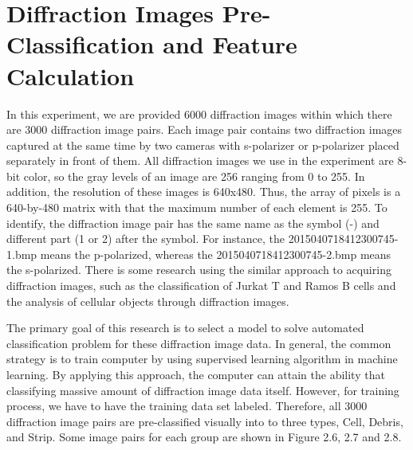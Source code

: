 \section{Diffraction Images Pre-Classification and Feature Calculation}
In this experiment, we are provided 6000 diffraction images within which there are 3000 diffraction image pairs. Each image pair contains two diffraction images captured at the same time by two cameras with s-polarizer or p-polarizer placed separately in front of them. All diffraction images we use in the experiment are 8-bit color, so the gray levels of an image are 256 ranging from 0 to 255. In addition, the resolution of these images is 640x480. Thus, the array of pixels is a 640-by-480 matrix with that the maximum number of each element is 255. To identify, the diffraction image pair has the same name as the symbol (-) and different part (1 or 2) after the symbol. For instance, the 2015040718412300745-1.bmp means the p-polarized, whereas the 2015040718412300745-2.bmp means the s-polarized. There is some research using the similar approach to acquiring diffraction images, such as the classification of Jurkat T and Ramos B cells\cite{Feng} and the analysis of cellular objects through diffraction images\cite{Zhang}. \par
The primary goal of this research is to select a model to solve automated classification problem for these diffraction image data. In general, the common strategy is to train computer by using supervised learning algorithm in machine learning. By applying this approach, the computer can attain the ability that classifying massive amount of diffraction image data itself. However, for training process, we have to have the training data set labeled. Therefore, all 3000 diffraction image pairs are pre-classified visually into to three types, Cell, Debris, and Strip. Some image pairs for each group are shown in Figure 2.6, 2.7 and 2.8. 
